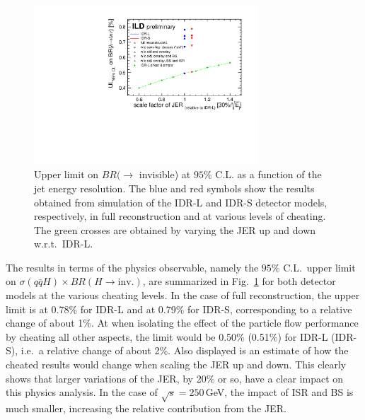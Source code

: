 \begin{figure}[htbp]
\begin{center}
 \includegraphics[width=0.75\textwidth]{Performance/fig/performance_plot.pdf}
\end{center}
\caption{Upper limit on $BR( \to $ invisible) at $95\%$ C.L. as a function of the jet energy resolution. The blue and red symbols show the results obtained from simulation of the IDR-L and IDR-S detector models, respectively, in full reconstruction and at various levels of cheating. The green crosses are obtained by varying the JER up and down w.r.t.\ IDR-L.
}
\label{fig:Hinv:BRlimit}
\end{figure}

The results in terms of the physics observable, namely the $95\%$ C.L.\ upper limit on $\sigma(q\bar{q} H)\times BR(H \to \mbox{inv.})$, are summarized in Fig.~\ref{fig:Hinv:BRlimit} for both detector models at the various cheating levels. In the case of full reconstruction, the upper limit is at 0.78\%  for IDR-L  and at  0.79\%  for IDR-S, corresponding to a relative change of about 1\%. At when isolating the effect of the particle flow performance by cheating all other aspects, the limit would be 0.50\% (0.51\%) for IDR-L (IDR-S), i.e.\ a relative change of about 2\%. Also displayed is an estimate of how
the cheated results would change when scaling the JER up and down. This clearly shows that
larger variations of the JER, by 20\% or so, have a clear impact on this physics analysis.
In the case of $\sqrt{s}=250$\,GeV, the impact of ISR and BS is much smaller, increasing the relative contribution from the JER.





